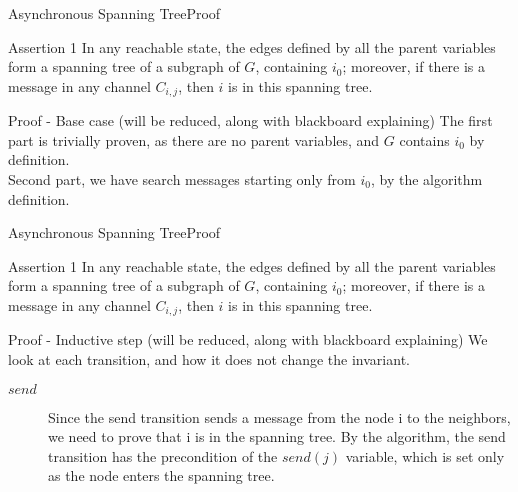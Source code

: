 \documentclass[pdf]{beamer}
\begin{document}
\begin{frame}[plain]{Asynchronous Spanning Tree}{Proof}
    \begin{block}{Assertion 1}
    In any reachable state, the edges defined by all the parent variables form a spanning tree
    of a subgraph of $G$, containing $i_0$; moreover, if there is a message in any channel $C_{i,j}$,
    then $i$ is in this spanning tree.
    \end{block}	
    \pause
    \begin{block}{Proof - Base case (will be reduced, along with blackboard explaining)}
    The first part is trivially proven,
    as there are no parent variables, and $G$ contains $i_0$ by definition.\\
    Second part, we have search messages starting only from $i_0$, by the algorithm definition.\\
    \end{block}
\end{frame}

\begin{frame}[plain]{Asynchronous Spanning Tree}{Proof}
    \begin{block}{Assertion 1}
    In any reachable state, the edges defined by all the parent variables form a spanning tree
    of a subgraph of $G$, containing $i_0$; moreover, if there is a message in any channel $C_{i,j}$,
    then $i$ is in this spanning tree.
    \end{block}	
    \begin{block}{Proof - Inductive step (will be reduced, along with blackboard explaining)}
    We look at each transition, and how it does not change the invariant.
    \begin{description}
    \item[$send$]{Since the send transition sends a message from the node i to the neighbors, we need
        to prove that i is in the spanning tree. By the algorithm, the send transition has the precondition of the $send(j)$ variable, which is set only as the node enters the spanning tree.}
    \end{description}
    \end{block}
\end{frame}
\end{document}
